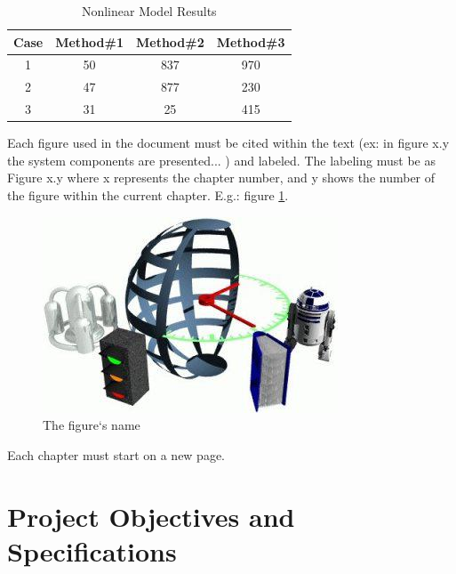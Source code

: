 \documentclass[12pt,a4paper,twoside]{report}
\begin{document}
\begin{table}[ht]
\caption{Nonlinear Model Results}
\centering                          %
\begin{tabular}{|c|c|c|c|}          %
\hline\hline                        %
Case & Method\#1 & Method\#2 & Method\#3 \\ [0.5ex]   %
\hline                              %
1 & 50 & 837 & 970 \\               %
2 & 47 & 877 & 230 \\
3 & 31 & 25 & 415 \\[1ex]           %
\hline                              
\end{tabular}
\label{table:nonlin}                %
\end{table}

Each figure used in the document must be cited within the text (ex: in figure x.y the system components are presented... ) and labeled. The labeling must be as Figure x.y where x represents the chapter number, and y shows the number of the figure within the current chapter. 
 E.g.: figure \ref{fig:imag}.

\begin{figure}[ht]
    \centering
\includegraphics[]{img/test.jpg}
    \caption{The figure`s name}
    \label{fig:imag}
\end{figure}

Each chapter must start on a new page.

\chapter{Project Objectives and Specifications}
\end{document}
